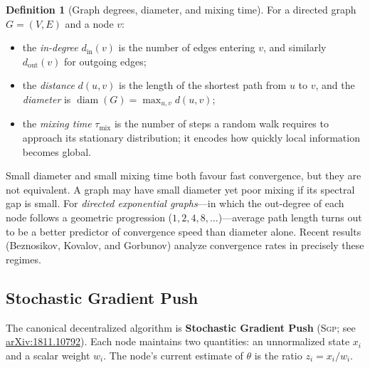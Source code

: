 \documentclass[11pt,a4paper]{article}
\theoremstyle{definition}
\newtheorem{definition}{Definition}[section]
\theoremstyle{remark}
\theoremstyle{plain}
\begin{document}
\begin{definition}[Graph degrees, diameter, and mixing time]
For a directed graph $G = (V,E)$ and a node $v$:
\begin{itemize}[leftmargin=1.5em, itemsep=2pt]
  \item the \emph{in-degree} $d_{\text{in}}(v)$ is the number of edges
        entering $v$, and similarly $d_{\text{out}}(v)$ for outgoing
        edges;
  \item the \emph{distance} $d(u,v)$ is the length of the shortest path
        from $u$ to $v$, and the \emph{diameter} is
        $\operatorname{diam}(G) = \max_{u,v} d(u,v)$;
  \item the \emph{mixing time} $\tau_{\text{mix}}$ is the number of steps
        a random walk requires to approach its stationary distribution; it
        encodes how quickly local information becomes global.
\end{itemize}
\end{definition}

Small diameter and small mixing time both favour fast convergence, but
they are not equivalent. A graph may have small diameter yet poor mixing
if its spectral gap is small. For \emph{directed exponential graphs}---in
which the out-degree of each node follows a geometric progression
($1, 2, 4, 8,\ldots$)---average path length turns out to be a better
predictor of convergence speed than diameter alone. Recent results
(Beznosikov, Kovalov, and Gorbunov) analyze convergence rates in
precisely these regimes.

\subsection{Stochastic Gradient Push}

The canonical decentralized algorithm is \textbf{Stochastic Gradient
Push} (\textsc{Sgp}; see
\href{https://arxiv.org/abs/1811.10792}{arXiv:1811.10792}). Each node
maintains two quantities: an unnormalized state $x_i$ and a scalar weight
$w_i$. The node's current estimate of $\theta$ is the ratio
$z_i = x_i / w_i$.
\end{document}
